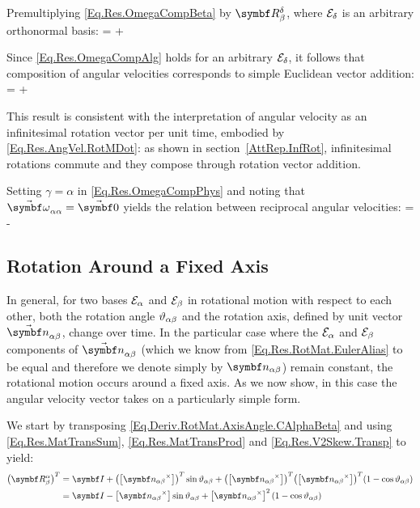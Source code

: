 Premultiplying \eqref{Eq.Res.OmegaCompBeta} by $\RotM{\delta}{\beta}$, where $\basis[\delta]$ is an arbitrary orthonormal basis:
{
\angvel{\alpha}{\beta}{\delta} = \angvel{\alpha}{\gamma}{\delta} + \angvel{\gamma}{\beta}{\delta}
}

Since \eqref{Eq.Res.OmegaCompAlg} holds for an arbitrary $\basis[\delta]$, it follows that composition of angular velocities corresponds to simple Euclidean vector addition:
{
\varel{\angvelsymb}{\alpha}{\beta} = \varel{\angvelsymb}{\alpha}{\gamma} + \varel{\angvelsymb}{\gamma}{\beta}
}

This result is consistent with the interpretation of angular velocity as an infinitesimal rotation vector per unit time, embodied by \eqref{Eq.Res.AngVel.RotMDot}: as shown in section~\ref{AttRep.InfRot}, infinitesimal rotations commute and they compose through rotation vector addition.

Setting $\gamma = \alpha$ in \eqref{Eq.Res.OmegaCompPhys} and noting that $\varel{\angvelsymb}{\alpha}{\alpha} = \vabs{0}$ yields the relation between reciprocal angular velocities:
{
\varel{\angvelsymb}{\alpha}{\beta} = -\varel{\angvelsymb}{\beta}{\alpha}
}

\subsection{Rotation Around a Fixed Axis} %
In general, for two bases $\basis[\alpha]$ and $\basis[\beta]$ in rotational motion with respect to each other, both the rotation angle $\rel{\rotang}{\alpha}{\beta}$ and the rotation axis, defined by unit vector $\varel{\rotax}{\alpha}{\beta}$, change over time. In the particular case where the $\basis[\alpha]$ and $\basis[\beta]$ components of $\varel{\rotax}{\alpha}{\beta}$ (which we know from \eqref{Eq.Res.RotMat.EulerAlias} to be equal and therefore we denote simply by $\vrel{\rotax}{\alpha}{\beta}$) remain constant, the rotational motion occurs around a fixed axis. As we now show, in this case the angular velocity vector takes on a particularly simple form.

We start by transposing \eqref{Eq.Deriv.RotMat.AxisAngle.CAlphaBeta} and using \eqref{Eq.Res.MatTransSum}, \eqref{Eq.Res.MatTransProd} and \eqref{Eq.Res.V2Skew.Transp} to yield:
\begin{equation} \label{Eq.Deriv.FixedAxis.CTransp}
\begin{split}
\trp{\RotM{\alpha}{\beta}} 	&= \IdM + \trp{\vskew{\vrel{\rotax}{\alpha}{\beta}}} \sin \rel{\rotang}{\alpha}{\beta} + \trp{\vskew{\vrel{\rotax}{\alpha}{\beta}}} \trp{\vskew{\vrel{\rotax}{\alpha}{\beta}}} (1-\cos \rel{\rotang}{\alpha}{\beta}) \\
					&= \IdM - \vskew{\vrel{\rotax}{\alpha}{\beta}} \sin \rel{\rotang}{\alpha}{\beta} + \vskew{\vrel{\rotax}{\alpha}{\beta}}^2 (1-\cos \rel{\rotang}{\alpha}{\beta})
\end{split}
\end{equation}

